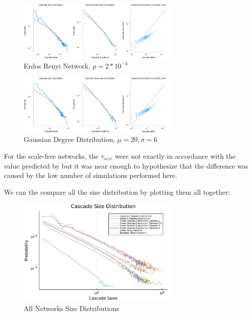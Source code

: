     \begin{figure}[H]
        \centering
        \includegraphics[width=0.7\textwidth]{images/Task15/ErdosRenyi.png}
        \caption{Erdos Renyi Network, $p = 2*10^{-4}$}
    \end{figure}

    \begin{figure}[H]
        \centering
        \includegraphics[width=0.7\textwidth]{images/Task15/RandomGaussian.png}
        \caption{Gaussian Degree Distribution, $\mu = 20, \sigma = 6$}
    \end{figure}

For the scale-free networks, the $\tau_{size}$ were not exactly in accordance with the value predicted by \cite{scale_free_sandpile} but it was near enough to hypothesize that the difference was caused by the low number of simulations performed here.


We can the compare all the size distribution by plotting them all together:

    \begin{figure}[H]
        \centering
        \includegraphics[width=0.7\textwidth]{images/Task15/AllNetworks.pdf}
        \caption{All Networks Size Distributions}
    \end{figure}

    
\newpage
